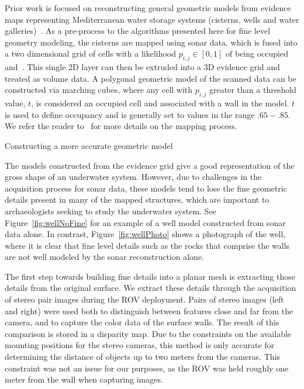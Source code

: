 \documentclass[twocolumn]{article}
\makeatletter
\def\section{\@startsection{section}{1}{\z@}{24pt plus 2 pt
minus 2 pt} {12pt plus 2pt minus 2pt}{\large\bf}}
\makeatother
\begin{document}
Prior work is focused on reconstructing general geometric models from evidence maps representing Mediterranean water storage systems (cisterns, wells and water galleries)~\cite{ICEX11,McVicker,McVicker2}. As a pre-process to the algorithms presented here for fine level geometry modeling, the cisterns are mapped using sonar data, which is fused into a two dimensional grid of cells with a likelihood $p_{i,j} \in [0,1]$ of being occupied \cite{Thrun2005} and~\cite{White10}. This single 2D layer can then be extruded into a 3D evidence grid and treated as volume data. A polygonal geometric model of the scanned data can be constructed via marching cubes, where any cell with $p_{i,j}$ greater than a threshold value, $t$, is considered an occupied cell and associated with a wall in the model. $t$ is used to define occupancy and is generally set to values in the range $.65-.85$. We refer the reader to~\cite{ICEX11,McVicker,McVicker2} for more details on the mapping process.

\section{Constructing a more accurate geometric model}
\label{sec:detail}

\noindent The models constructed from the evidence grid give a good representation of the gross shape of an underwater system. However, due to challenges in the acquisition process for sonar data, these models tend to lose the fine geometric details present in many of the mapped structures, which are important to archaeologists seeking to study the underwater system. See Figure~\ref{fig:wellNoFine} for an example of a well model constructed from sonar data alone. In contrast, Figure~\ref{fig:wellPhoto} shows a photograph of the well, where it is clear that fine level details such as the rocks that comprise the walls are not well modeled by the sonar reconstruction alone.

The first step towards building fine details into a planar mesh is extracting those details from the original surface. We extract these details through the acquisition of stereo pair images during the ROV deployment. Pairs of stereo images (left and right) were used both to distinguish between features close and far from the camera, and to capture the color data of the surface walls.
The result of this comparison is stored in a disparity map. Due to the constraints on the available mounting positions for the stereo cameras, this method is only accurate for determining the distance of objects up to two meters from the cameras. This constraint was not an issue for our purposes, as the ROV was held roughly one meter from the wall when capturing images.
\end{document}
